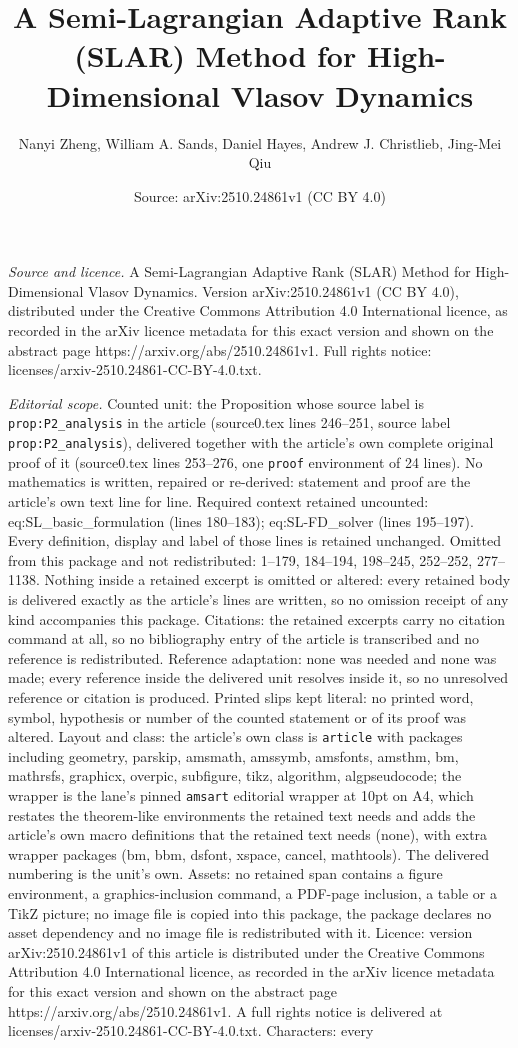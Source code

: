 \documentclass[10pt,a4paper]{amsart}
\title[A Semi-Lagrangian Adaptive Rank (SLAR) Method for High-Dimen]{A Semi-Lagrangian Adaptive Rank (SLAR) Method for High-Dimensional Vlasov Dynamics}
\author{Nanyi Zheng, William A. Sands, Daniel Hayes, Andrew J. Christlieb, Jing-Mei Qiu}
\date{Source: arXiv:2510.24861v1 (CC BY 4.0)}
\begin{document}
\maketitle

\noindent\emph{Source and licence.} A Semi-Lagrangian Adaptive Rank (SLAR) Method for High-Dimensional Vlasov Dynamics. Version arXiv:2510.24861v1 (CC BY 4.0), distributed under the Creative Commons Attribution 4.0 International licence, as recorded in the arXiv licence metadata for this exact version and shown on the abstract page https://arxiv.org/abs/2510.24861v1. Full rights notice: licenses/arxiv-2510.24861-CC-BY-4.0.txt.\par\smallskip

\noindent\textit{Editorial scope.} Counted unit: the Proposition whose source label is \texttt{prop:P2\_analysis} in the article (source0.tex lines 246--251, source label \texttt{prop:P2\_analysis}), delivered together with the article's own complete original proof of it (source0.tex lines 253--276, one \texttt{proof} environment of 24 lines). No mathematics is written, repaired or re-derived: statement and proof are the article's own text line for line. Required context retained uncounted: eq:SL\_basic\_formulation (lines 180--183); eq:SL-FD\_solver (lines 195--197). Every definition, display and label of those lines is retained unchanged. Omitted from this package and not redistributed: 1--179, 184--194, 198--245, 252--252, 277--1138. Nothing inside a retained excerpt is omitted or altered: every retained body is delivered exactly as the article's lines are written, so no omission receipt of any kind accompanies this package. Citations: the retained excerpts carry no citation command at all, so no bibliography entry of the article is transcribed and no reference is redistributed. Reference adaptation: none was needed and none was made; every reference inside the delivered unit resolves inside it, so no unresolved reference or citation is produced. Printed slips kept literal: no printed word, symbol, hypothesis or number of the counted statement or of its proof was altered. Layout and class: the article's own class is \texttt{article} with packages including geometry, parskip, amsmath, amssymb, amsfonts, amsthm, bm, mathrsfs, graphicx, overpic, subfigure, tikz, algorithm, algpseudocode; the wrapper is the lane's pinned \texttt{amsart} editorial wrapper at 10pt on A4, which restates the theorem-like environments the retained text needs and adds the article's own macro definitions that the retained text needs (none), with extra wrapper packages (bm, bbm, dsfont, xspace, cancel, mathtools). The delivered numbering is the unit's own. Assets: no retained span contains a figure environment, a graphics-inclusion command, a PDF-page inclusion, a table or a TikZ picture; no image file is copied into this package, the package declares no asset dependency and no image file is redistributed with it. Licence: version arXiv:2510.24861v1 of this article is distributed under the Creative Commons Attribution 4.0 International licence, as recorded in the arXiv licence metadata for this exact version and shown on the abstract page https://arxiv.org/abs/2510.24861v1. A full rights notice is delivered at licenses/arxiv-2510.24861-CC-BY-4.0.txt. Characters: every 
\end{document}
